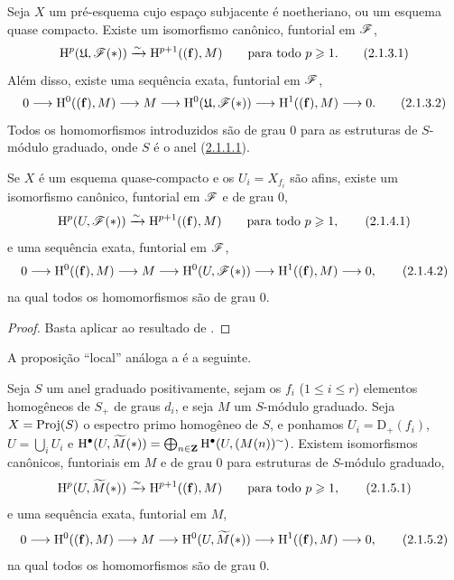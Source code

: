 \begin{proposition}[2.1.3]
\label{III.2.1.3}
Seja $X$ um pré-esquema cujo espaço subjacente é noetheriano, ou um esquema quase compacto.
Existe um isomorfismo canônico, funtorial em $\mathscr{F}$,
\[
\label{III.2.1.3.1}
  \HH^p(\mathfrak{U},\sh{F}(*)) \simto \HH^{p+1}((\mathbf{f}),M)
  \qquad\text{para todo } p\geq 1.
  \tag{2.1.3.1}
\]
Além disso, existe uma sequência exata, funtorial em $\mathscr{F}$,
\[
\label{III.2.1.3.2}
  0 \to \HH^0((\mathbf{f}),M) \to M \to \HH^0(\mathfrak{U},\sh{F}(*)) \to \HH^1((\mathbf{f}),M) \to 0.
  \tag{2.1.3.2}
\]
Todos os homomorfismos introduzidos são de grau $0$ para as estruturas de $S$-módulo graduado, onde $S$ é o anel (\hyperref[III.2.1.1.1]{2.1.1.1}).
\end{proposition}

\begin{corollary}[2.1.4]
\label{III.2.1.4}
Se $X$ é um esquema quase-compacto e os $U_i=X_{f_i}$ são afins, existe um isomorfismo canônico, funtorial em $\mathscr{F}$ e de grau $0$,
\[
\label{III.2.1.4.1}
  \HH^p(U,\sh{F}(*)) \simto \HH^{p+1}((\mathbf{f}),M)
  \qquad\text{para todo } p\geq 1,
  \tag{2.1.4.1}
\]
e uma sequência exata, funtorial em $\mathscr{F}$,
\[
\label{III.2.1.4.2}
  0 \to \HH^0((\mathbf{f}),M) \to M \to \HH^0(U,\sh{F}(*)) \to \HH^1((\mathbf{f}),M) \to 0,
  \tag{2.1.4.2}
\]
na qual todos os homomorfismos são de grau $0$.
\end{corollary}

\begin{proof}
Basta aplicar  ao resultado de .
\end{proof}

A proposição ``local'' análoga a  é a seguinte.

\begin{proposition}[2.1.5]
\label{III.2.1.5}
Seja $S$ um anel graduado positivamente, sejam os $f_i$ ($1\leq i\leq r$) elementos homogêneos de $S_+$ de graus $d_i$, e seja $M$ um $S$-módulo graduado.
Seja $X=\operatorname{Proj}(S)$ o espectro primo homogêneo de $S$, e ponhamos $U_i=\mathrm{D}_+(f_i)$, $U=\bigcup_i U_i$ e $\mathrm{H}^\bullet(U,\widetilde{M}(*))=\bigoplus_{n\in\mathbf{Z}}\mathrm{H}^\bullet(U,(M(n))^\sim)$.
Existem isomorfismos canônicos, funtoriais em $M$ e de grau $0$ para estruturas de $S$-módulo graduado,
\[
\label{III.2.1.5.1}
  \HH^p(U,\widetilde{M}(*)) \simto \HH^{p+1}((\mathbf{f}),M)
  \qquad\text{para todo } p\geq 1,
  \tag{2.1.5.1}
\]
e uma sequência exata, funtorial em $M$,
\[
\label{III.2.1.5.2}
  0 \to \HH^0((\mathbf{f}),M) \to M \to \HH^0(U,\widetilde{M}(*)) \to \HH^1((\mathbf{f}),M) \to 0,
  \tag{2.1.5.2}
\]
na qual todos os homomorfismos são de grau $0$.
\end{proposition}

